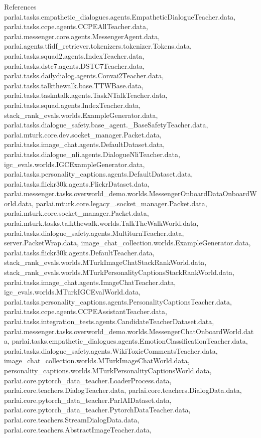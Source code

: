 References parlai.\+tasks.\+empathetic\+\_\+dialogues.\+agents.\+Empathetic\+Dialogue\+Teacher.\+data, parlai.\+tasks.\+ccpe.\+agents.\+C\+C\+P\+E\+All\+Teacher.\+data, parlai.\+messenger.\+core.\+agents.\+Messenger\+Agent.\+data, parlai.\+agents.\+tfidf\+\_\+retriever.\+tokenizers.\+tokenizer.\+Tokens.\+data, parlai.\+tasks.\+squad2.\+agents.\+Index\+Teacher.\+data, parlai.\+tasks.\+dstc7.\+agents.\+D\+S\+T\+C7\+Teacher.\+data, parlai.\+tasks.\+dailydialog.\+agents.\+Convai2\+Teacher.\+data, parlai.\+tasks.\+talkthewalk.\+base.\+T\+T\+W\+Base.\+data, parlai.\+tasks.\+taskntalk.\+agents.\+Task\+N\+Talk\+Teacher.\+data, parlai.\+tasks.\+squad.\+agents.\+Index\+Teacher.\+data, stack\+\_\+rank\+\_\+evals.\+worlds.\+Example\+Generator.\+data, parlai.\+tasks.\+dialogue\+\_\+safety.\+base\+\_\+agent.\+\_\+\+Base\+Safety\+Teacher.\+data, parlai.\+mturk.\+core.\+dev.\+socket\+\_\+manager.\+Packet.\+data, parlai.\+tasks.\+image\+\_\+chat.\+agents.\+Default\+Dataset.\+data, parlai.\+tasks.\+dialogue\+\_\+nli.\+agents.\+Dialogue\+Nli\+Teacher.\+data, igc\+\_\+evals.\+worlds.\+I\+G\+C\+Example\+Generator.\+data, parlai.\+tasks.\+personality\+\_\+captions.\+agents.\+Default\+Dataset.\+data, parlai.\+tasks.\+flickr30k.\+agents.\+Flickr\+Dataset.\+data, parlai.\+messenger.\+tasks.\+overworld\+\_\+demo.\+worlds.\+Messenger\+Onboard\+Data\+Onboard\+World.\+data, parlai.\+mturk.\+core.\+legacy\+\_.\+socket\+\_\+manager.\+Packet.\+data, parlai.\+mturk.\+core.\+socket\+\_\+manager.\+Packet.\+data, parlai.\+mturk.\+tasks.\+talkthewalk.\+worlds.\+Talk\+The\+Walk\+World.\+data, parlai.\+tasks.\+dialogue\+\_\+safety.\+agents.\+Multiturn\+Teacher.\+data, server.\+Packet\+Wrap.\+data, image\+\_\+chat\+\_\+collection.\+worlds.\+Example\+Generator.\+data, parlai.\+tasks.\+flickr30k.\+agents.\+Default\+Teacher.\+data, stack\+\_\+rank\+\_\+evals.\+worlds.\+M\+Turk\+Image\+Chat\+Stack\+Rank\+World.\+data, stack\+\_\+rank\+\_\+evals.\+worlds.\+M\+Turk\+Personality\+Captions\+Stack\+Rank\+World.\+data, parlai.\+tasks.\+image\+\_\+chat.\+agents.\+Image\+Chat\+Teacher.\+data, igc\+\_\+evals.\+worlds.\+M\+Turk\+I\+G\+C\+Eval\+World.\+data, parlai.\+tasks.\+personality\+\_\+captions.\+agents.\+Personality\+Captions\+Teacher.\+data, parlai.\+tasks.\+ccpe.\+agents.\+C\+C\+P\+E\+Assistant\+Teacher.\+data, parlai.\+tasks.\+integration\+\_\+tests.\+agents.\+Candidate\+Teacher\+Dataset.\+data, parlai.\+messenger.\+tasks.\+overworld\+\_\+demo.\+worlds.\+Messenger\+Chat\+Onboard\+World.\+data, parlai.\+tasks.\+empathetic\+\_\+dialogues.\+agents.\+Emotion\+Classification\+Teacher.\+data, parlai.\+tasks.\+dialogue\+\_\+safety.\+agents.\+Wiki\+Toxic\+Comments\+Teacher.\+data, image\+\_\+chat\+\_\+collection.\+worlds.\+M\+Turk\+Image\+Chat\+World.\+data, personality\+\_\+captions.\+worlds.\+M\+Turk\+Personality\+Captions\+World.\+data, parlai.\+core.\+pytorch\+\_\+data\+\_\+teacher.\+Loader\+Process.\+data, parlai.\+core.\+teachers.\+Dialog\+Teacher.\+data, parlai.\+core.\+teachers.\+Dialog\+Data.\+data, parlai.\+core.\+pytorch\+\_\+data\+\_\+teacher.\+Parl\+A\+I\+Dataset.\+data, parlai.\+core.\+pytorch\+\_\+data\+\_\+teacher.\+Pytorch\+Data\+Teacher.\+data, parlai.\+core.\+teachers.\+Stream\+Dialog\+Data.\+data, parlai.\+core.\+teachers.\+Abstract\+Image\+Teacher.\+data, 